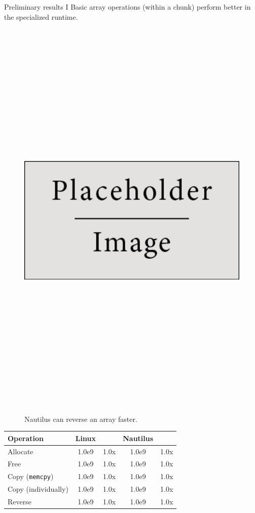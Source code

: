 \begin{block}{Preliminary results I}
  Basic array operations (within a chunk) perform better in the specialized runtime.

  \begin{figure}
    \includegraphics[height=20cm]{place_holder.png}
    \caption{Nautilus can reverse an array faster.}
  \end{figure}

  \begin{table}
    \begin{tabular}{l || c c | c c}
      Operation & Linux & & Nautilus & \\
      \hline\hline
      Allocate & 1.0e9 & 1.0x & 1.0e9 & 1.0x \\\hline
      Free & 1.0e9 & 1.0x & 1.0e9 & 1.0x \\\hline
      Copy (\texttt{memcpy}) & 1.0e9 & 1.0x & 1.0e9 & 1.0x \\\hline
      Copy (individually) & 1.0e9 & 1.0x & 1.0e9 & 1.0x \\\hline
      Reverse & 1.0e9 & 1.0x & 1.0e9 & 1.0x \\
    \end{tabular}


\end{table}
\end{block}
